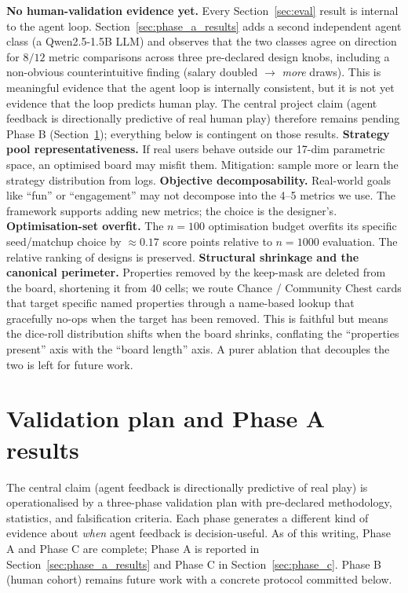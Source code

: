\documentclass[10pt]{article}
\begin{document}
\textbf{No human-validation evidence yet.} Every Section~\ref{sec:eval}
result is internal to the agent loop. Section~\ref{sec:phase_a_results}
adds a second independent agent class (a Qwen2.5-1.5B LLM) and observes
that the two classes agree on direction for $8/12$ metric comparisons
across three pre-declared design knobs, including a non-obvious
counterintuitive finding (salary doubled $\to$ \emph{more} draws). This
is meaningful evidence that the agent loop is internally consistent,
but it is not yet evidence that the loop predicts human play. The
central project claim (agent feedback is directionally predictive of
real human play) therefore remains pending Phase B
(Section~\ref{sec:validation}); everything below is contingent on
those results.
\textbf{Strategy pool representativeness.} If real users behave outside our
17-dim parametric space, an optimised board may misfit them. Mitigation:
sample more or learn the strategy distribution from logs.
\textbf{Objective decomposability.} Real-world goals like ``fun'' or
``engagement'' may not decompose into the 4--5 metrics we use. The
framework supports adding new metrics; the choice is the designer's.
\textbf{Optimisation-set overfit.} The $n{=}100$ optimisation budget
overfits its specific seed/matchup choice by $\approx 0.17$ score points
relative to $n{=}1000$ evaluation. The relative ranking of designs is
preserved.
\textbf{Structural shrinkage and the canonical perimeter.} Properties
removed by the keep-mask are deleted from the board, shortening it from
40 cells; we route Chance / Community Chest cards that target specific
named properties through a name-based lookup that gracefully no-ops when
the target has been removed. This is faithful but means the dice-roll
distribution shifts when the board shrinks, conflating the
``properties present'' axis with the ``board length'' axis. A purer
ablation that decouples the two is left for future work.

\section{Validation plan and Phase A results}\label{sec:validation}

The central claim (agent feedback is directionally predictive of
real play) is operationalised by a three-phase validation plan with
pre-declared methodology, statistics, and falsification criteria.
Each phase generates a different kind of evidence about \emph{when}
agent feedback is decision-useful. As of this writing, Phase A and
Phase C are complete; Phase A is reported in
Section~\ref{sec:phase_a_results} and Phase C in
Section~\ref{sec:phase_c}. Phase B (human cohort) remains future
work with a concrete protocol committed below.
\end{document}
